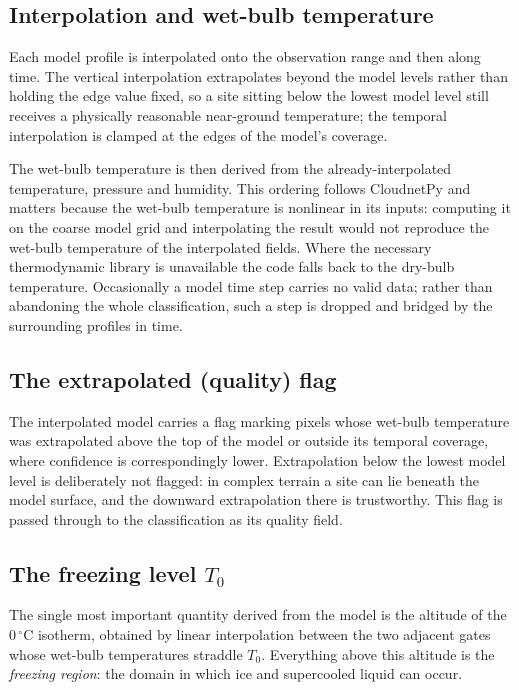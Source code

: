 \documentclass[11pt,a4paper]{article}
\newcommand{\degc}{\ensuremath{^\circ\mathrm{C}}}
\newcommand{\Tzero}{\ensuremath{T_0}}
\begin{document}
\subsection{Interpolation and wet-bulb temperature}

Each model profile is interpolated onto the observation range and then along time.
The vertical interpolation extrapolates beyond the model levels rather than
holding the edge value fixed, so a site sitting below the lowest model level still
receives a physically reasonable near-ground temperature; the temporal
interpolation is clamped at the edges of the model's coverage.

The wet-bulb temperature is then derived from the already-interpolated
temperature, pressure and humidity. This ordering follows CloudnetPy and matters
because the wet-bulb temperature is nonlinear in its inputs: computing it on the
coarse model grid and interpolating the result would not reproduce the wet-bulb
temperature of the interpolated fields. Where the necessary thermodynamic library
is unavailable the code falls back to the dry-bulb temperature. Occasionally a
model time step carries no valid data; rather than abandoning the whole
classification, such a step is dropped and bridged by the surrounding profiles in
time.

\subsection{The extrapolated (quality) flag}

The interpolated model carries a flag marking pixels whose wet-bulb temperature
was extrapolated above the top of the model or outside its temporal coverage,
where confidence is correspondingly lower. Extrapolation below the lowest model
level is deliberately not flagged: in complex terrain a site can lie beneath the
model surface, and the downward extrapolation there is trustworthy. This flag is
passed through to the classification as its quality field.

\subsection{The freezing level \texorpdfstring{$\Tzero$}{T0}}
\label{sec:t0}

The single most important quantity derived from the model is the altitude of the
$0\,\degc$ isotherm, obtained by linear interpolation between the two adjacent
gates whose wet-bulb temperatures straddle \Tzero{}. Everything above this altitude
is the \emph{freezing region}: the domain in which ice and supercooled liquid can
occur.
\end{document}
